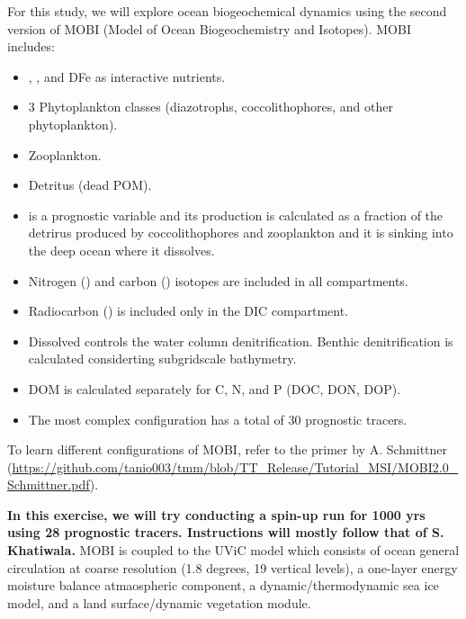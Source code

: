 \documentclass[a4paper]{article}
\def\noin{\noindent }
\begin{document}
For this study, we will explore ocean biogeochemical dynamics using the second version of MOBI (Model of Ocean Biogeochemistry and Isotopes). MOBI includes:
\begin{itemize}
\item {}, , and DFe as interactive nutrients.
\item 3 Phytoplankton classes (diazotrophs, coccolithophores, and other phytoplankton).
\item Zooplankton.
\item Detritus (dead POM).
\item {} is a prognostic variable and its production is calculated as a fraction of the detrirus produced by coccolithophores and zooplankton and it is sinking into the deep ocean where it dissolves.
\item Nitrogen () and carbon () isotopes are included in all compartments.
\item Radiocarbon () is included only in the DIC compartment.
\item Dissolved  controls the water column denitrification. Benthic denitrification is calculated considerting subgridscale bathymetry.
\item DOM is calculated separately for C, N, and P (DOC, DON, DOP).
\item The most complex configuration has a total of 30 prognostic tracers.
\end{itemize}
\noin To learn different configurations of MOBI, refer to the primer by A. Schmittner (\url{https://github.com/tanio003/tmm/blob/TT_Release/Tutorial_MSI/MOBI2.0_Schmittner.pdf}). 

\textbf{In this exercise, we will try conducting a spin-up run for 1000 yrs using 28 prognostic tracers. Instructions will mostly follow that of S. Khatiwala.} MOBI is coupled to the UViC model which consists of ocean general circulation at coarse resolution (1.8 degrees, 19 vertical levels), a one-layer energy moisture balance atmaospheric component, a dynamic/thermodynamic sea ice model, and a land surface/dynamic vegetation module. 
\end{document}
